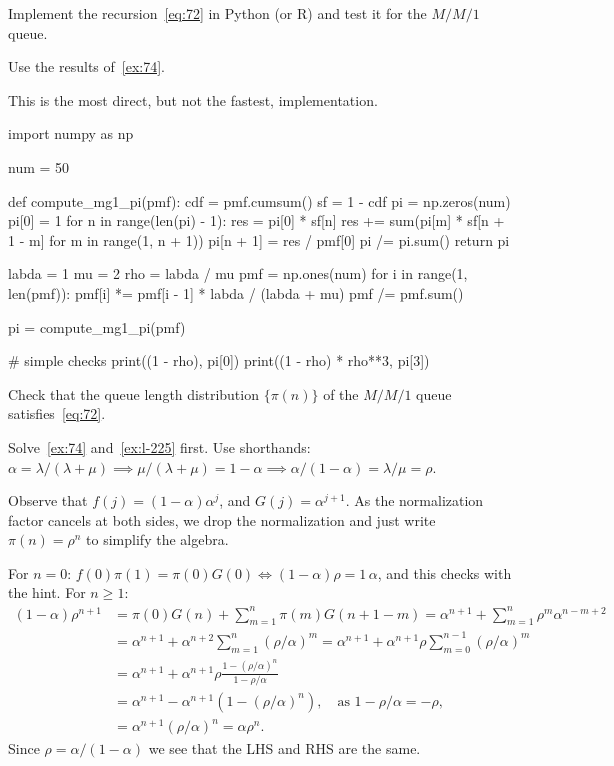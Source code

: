 \documentclass[stochastic-or.tex]{subfiles}
\begin{document}
\begin{exercise}
Implement the recursion~\cref{eq:72} in Python (or R) and test it for the $M/M/1$ queue.
\begin{hint}
Use the results of~\cref{ex:74}.
\end{hint}
\begin{solution}
This is the most direct, but not the fastest, implementation.
\begin{python}
import numpy as np

num = 50


def compute_mg1_pi(pmf):
    cdf = pmf.cumsum()
    sf = 1 - cdf
    pi = np.zeros(num)
    pi[0] = 1
    for n in range(len(pi) - 1):
        res = pi[0] * sf[n]
        res += sum(pi[m] * sf[n + 1 - m] for m in range(1, n + 1))
        pi[n + 1] = res / pmf[0]
    pi /= pi.sum()
    return pi


labda = 1
mu = 2
rho = labda / mu
pmf = np.ones(num)
for i in range(1, len(pmf)):
    pmf[i] *= pmf[i - 1] * labda / (labda + mu)
pmf /= pmf.sum()


pi = compute_mg1_pi(pmf)

# simple checks
print((1 - rho), pi[0])
print((1 - rho) * rho**3, pi[3])
\end{python}
\end{solution}
\end{exercise}



\begin{exercise}\label{ex:l-229}
Check
 that the queue length distribution $\{\pi(n)\}$ of the $M/M/1$ queue satisfies~\cref{eq:72}.
\begin{hint}
Solve~\cref{ex:74} and~\cref{ex:l-225} first. Use shorthands:
$\alpha=\lambda/(\lambda+\mu) \implies \mu/(\lambda+\mu) = 1-\alpha \implies \alpha/(1-\alpha) = \lambda /\mu = \rho$.
\end{hint}
\begin{solution}
  Observe that $f(j)=(1-\alpha)\alpha^j$, and $G(j) = \alpha^{j+1}$.
  As the normalization factor cancels at both sides, we drop the normalization and  just write $\pi(n) = \rho^n$ to simplify the algebra.

For $n=0$: $f(0) \pi(1) = \pi(0) G(0) \iff (1-\alpha) \rho  = 1\, \alpha$, and this checks with the hint.
For $n\geq 1$:
\begin{align*}
 (1-\alpha)\rho^{n+1}
&= \pi(0) G(n) + \sum_{m=1}^n\pi(m) G(n+1-m)
=\alpha^{n+1} + \sum_{m=1}^n \rho^m \alpha^{n-m+2} \\
&= \alpha^{n+1} + \alpha^{n+2}\sum_{m=1}^n (\rho/\alpha)^m
= \alpha^{n+1} + \alpha^{n+1}\rho \sum_{m=0}^{n-1} (\rho/\alpha)^m \\
&= \alpha^{n+1} + \alpha^{n+1}\rho \frac{1-(\rho/\alpha)^n}{1-\rho/\alpha}\\
&= \alpha^{n+1} - \alpha^{n+1}(1-(\rho/\alpha)^n), \quad\text{as } 1- \rho/\alpha = -\rho,\\
&= \alpha^{n+1}(\rho/\alpha)^n = \alpha \rho^n.
\end{align*}
Since $\rho=\alpha/(1-\alpha)$ we see that the LHS and RHS are the same.
\end{solution}
\end{exercise}




\end{document}
